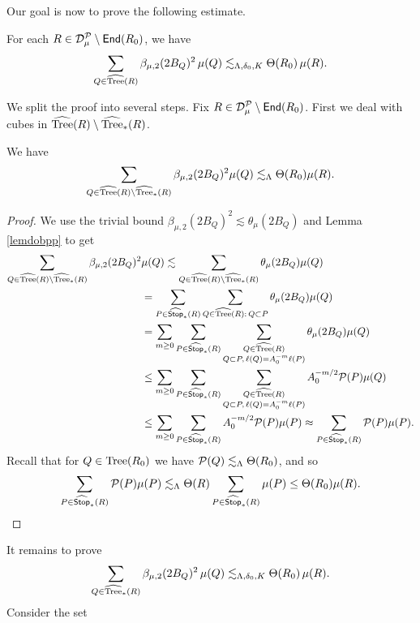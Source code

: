 Our goal is now to prove the following estimate.
\begin{lemma}\label{lembetas99}
	For each $R\in{\mathcal D}_\mu^{\mathcal P}\setminus{\mathsf{End}}(R_0)$, we have
	$$\sum_{Q\in{\widehat{{\rm Tree}}}(R)}\beta_{\mu,2}(2B_Q)^2\,\mu(Q)\lesssim_{\Lambda,\delta_0,K}\Theta(R_0)\,\mu(R).$$
\end{lemma}
We split the proof into several steps. Fix $R\in{\mathcal D}_\mu^{\mathcal P}\setminus{\mathsf{End}}(R_0)$. First we deal with cubes in ${\widehat{{\rm Tree}}}(R)\setminus{\widehat{{\rm Tree}}}_*(R)$.
\begin{lemma}
	We have
	\begin{equation*}
	\sum_{Q\in{\widehat{{\rm Tree}}}(R)\setminus{\widehat{{\rm Tree}}}_*(R)}\beta_{\mu,2}(2B_Q)^2\mu(Q)\lesssim_{\Lambda}\Theta(R_0)\mu(R).
	\end{equation*}
\end{lemma}
\begin{proof}
	We use the trivial bound $\beta_{\mu,2}(2B_Q)^2\lesssim\theta_\mu(2B_Q)$ and Lemma \ref{lemdobpp} to get
	\begin{align*}
	\sum_{Q\in{\widehat{{\rm Tree}}}(R)\setminus{\widehat{{\rm Tree}}}_*(R)}\beta_{\mu,2}(2B_Q)^2&\mu(Q)
	\lesssim\sum_{Q\in{\widehat{{\rm Tree}}}(R)\setminus{\widehat{{\rm Tree}}}_*(R)}\theta_{\mu}(2B_Q)\mu(Q)\\
	&=\sum_{P\in{\widehat{{\mathsf{Stop}}}}_*(R)}\sum_{Q\in{\widehat{{\rm Tree}}}(R):\, Q\subset P }\theta_{\mu}(2B_Q)\mu(Q)\\
	&= \sum_{m\ge 0} \sum_{P\in{\widehat{{\mathsf{Stop}}}}_*(R)}\sum_{\substack{Q\in{\widehat{{\rm Tree}}}(R)\\ Q\subset P,\, \ell(Q)=A_0^{-m}\ell(P) }}\theta_{\mu}(2B_Q)\mu(Q)\\
	&\le \sum_{m\ge 0} \sum_{P\in{\widehat{{\mathsf{Stop}}}}_*(R)}\sum_{\substack{Q\in{\widehat{{\rm Tree}}}(R)\\ Q\subset P,\, \ell(Q)=A_0^{-m}\ell(P) }}A_0^{-m/2}{\mathcal P}(P)\mu(Q)\\
	&\le \sum_{m\ge 0} \sum_{P\in{\widehat{{\mathsf{Stop}}}}_*(R)}A_0^{-m/2}{\mathcal P}(P)\mu(P)\approx  \sum_{P\in{\widehat{{\mathsf{Stop}}}}_*(R)}{\mathcal P}(P)\mu(P).
	\end{align*}
	Recall that for $Q\in{\rm Tree}(R_0)$ we have ${\mathcal P}(Q)\lesssim_{\Lambda}\Theta(R_0)$, and so
	\begin{equation*}
	\sum_{P\in{\widehat{{\mathsf{Stop}}}}_*(R)}{\mathcal P}(P)\mu(P)\lesssim_{\Lambda}\Theta(R)\sum_{P\in{\widehat{{\mathsf{Stop}}}}_*(R)}\mu(P) \le \Theta(R_0)\mu(R).
	\end{equation*}
\end{proof}
It remains to prove
\begin{equation*}
\sum_{Q\in{\widehat{{\rm Tree}}}_*(R)}\beta_{\mu,2}(2B_Q)^2\,\mu(Q)\lesssim_{\Lambda,\delta_0,K}\Theta(R_0)\,\mu(R).
\end{equation*}
Consider the set
